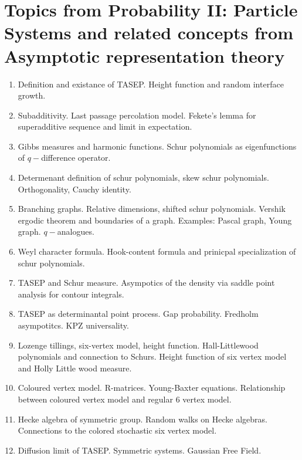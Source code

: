 \documentclass{article}
\begin{document}
\section*{Topics from Probability II: Particle Systems and related concepts from Asymptotic representation theory}
\begin{enumerate}
    \item Definition and existance of TASEP. Height function and random interface growth. 
    \item Subadditivity. Last passage percolation model. Fekete's lemma for superadditive sequence and limit in expectation. 
    \item Gibbs measures and harmonic functions. Schur polynomials as eigenfunctions of $q-$difference operator.
    \item Determenant definition of schur polynomials, skew schur polynomials. Orthogonality, Cauchy identity.
    \item Branching graphs. Relative dimensions, shifted schur polynomials. Vershik ergodic theorem and boundaries of a graph.  Examples: Pascal graph, Young graph. $q-$analogues.
    \item Weyl character formula. Hook-content formula and prinicpal specialization of schur polynomials.
    \item TASEP and Schur measure. Asympotics of the density via saddle point analysis for contour integrals.
    \item TASEP as determinantal point process. Gap probability. Fredholm asympotitcs. KPZ universality.
    \item Lozenge tillings, six-vertex model, height function. Hall-Littlewood polynomials and connection to Schurs. Height function of six vertex model and Holly Little wood measure.
    \item Coloured vertex model. R-matrices. Young-Baxter equations. Relationship between coloured vertex model and regular 6 vertex model.
    \item Hecke algebra of symmetric group. Random walks on Hecke algebras. Connections to the colored stochastic six vertex model.
    \item Diffusion limit of TASEP. Symmetric systems. Gaussian Free Field.
\end{enumerate}



\nocite{*}
\end{document}
